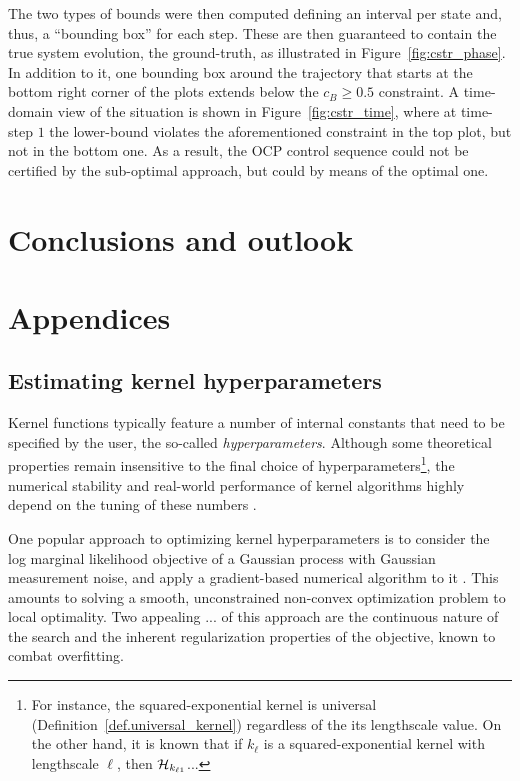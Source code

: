 The two types of bounds were then computed defining an interval per state and, thus, a ``bounding box'' for each step. These are then guaranteed to contain the true system evolution, the ground-truth, as illustrated in Figure~\ref{fig:cstr_phase}. 
In addition to it, one bounding box around the trajectory that starts at the bottom right corner of the plots extends below the $c_B \geq 0.5$ constraint. A time-domain view of the situation is shown in Figure~\ref{fig:cstr_time}, where at time-step $1$ the lower-bound violates the aforementioned constraint in the top plot, but not in the bottom one. As a result, the OCP control sequence could not be certified by the sub-optimal approach, but could by means of the optimal one.


\section{Conclusions and outlook}

\section{Appendices}

\subsection{Estimating kernel hyperparameters}
\label{sec.appendix_hyerparams}

Kernel functions typically feature a number of internal constants that need to be specified by the user, the so-called \textit{hyperparameters}. Although some theoretical properties remain insensitive to the final choice of hyperparameters\footnote{For instance, the squared-exponential kernel is universal (Definition~\ref{def.universal_kernel}) regardless of the its lengthscale value. On the other hand, it is known that if $k_\ell$ is a squared-exponential kernel with lengthscale $\ell$, then $\mathcal{H}_{k_{\ell1}}$... }, the numerical stability and real-world performance of kernel algorithms highly depend on the tuning of these numbers \citep{fasshauer2011positive}. 

One popular approach to optimizing kernel hyperparameters is to consider the log marginal likelihood objective of a Gaussian process with Gaussian measurement noise, and apply a gradient-based numerical algorithm to it \citep[§5.4.1]{williams2006gaussian}. This amounts to solving a smooth, unconstrained non-convex optimization problem to local optimality.  Two appealing ... of this approach are the continuous nature of the search and the inherent regularization properties of the objective, known to combat overfitting. 

